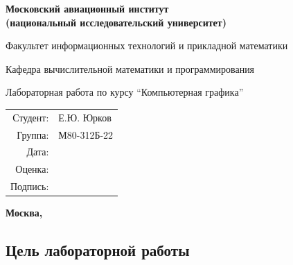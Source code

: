 \documentclass[12pt]{article}
\begin{document}
\begin{titlepage}

    \begin{center}

        \bfseries
        {\small Московский авиационный институт\\ 
        (национальный исследовательский университет)}

        {\small Факультет информационных технологий и прикладной 
        математики}
        
        {\small Кафедра вычислительной математики и программирования}
        
        \vspace{8cm}
        {\Large Лабораторная работа  по курсу} 
        \enquote{\Large Компьютерная графика}
        
    \end{center}
    
    \vspace{84pt}
    \begin{flushright}
        \begin{tabular}{rl}
            Студент: & Е.Ю. Юрков \\
            Группа: & М80-312Б-22 \\
            Дата: & \\
            Оценка: & \\
            Подпись: & \\
        \end{tabular}
    \end{flushright}
    
    \vfill
    
    \begin{center}
        
        \bfseries
        Москва, \the\year
    
    \end{center}

\end{titlepage}


\subsection*{Цель лабораторной работы}
\end{document}
